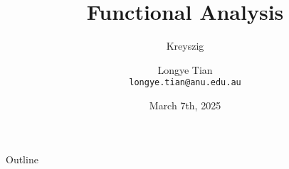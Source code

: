 \documentclass[aspectratio=169]{beamer} %
\title[FA]{Functional Analysis}
\subtitle{Kreyszig}
\author[Longye]{Longye Tian \\ \texttt{longye.tian@anu.edu.au}}
\institute[ANU]{Australian National University\\ School of Economics}
\date{March 7th, 2025}
\begin{document}
\begin{frame}
  \titlepage
\end{frame}

\begin{frame}{Outline}
  \tableofcontents
\end{frame}














\end{document}

